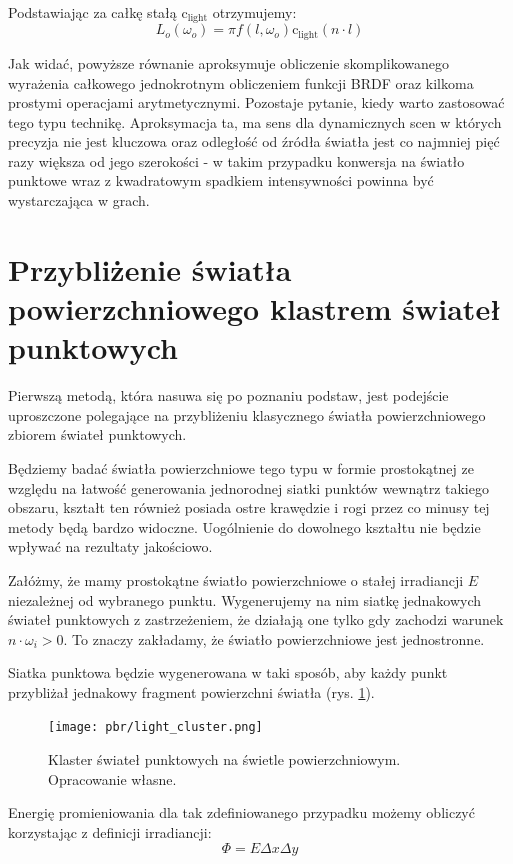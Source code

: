 \documentclass[../main.tex]{subfiles}
\newcommand{\clightcolor}{\text{c}_{\text{light}}}
\begin{document}
Podstawiając za całkę stałą $\clightcolor$ otrzymujemy:
\[
	L_o(\omega_o) = \pi f(l, \omega_o) \clightcolor (n \cdot l)
\]

Jak widać, powyższe równanie aproksymuje obliczenie skomplikowanego wyrażenia całkowego jednokrotnym obliczeniem funkcji BRDF oraz kilkoma prostymi operacjami arytmetycznymi. Pozostaje pytanie, kiedy warto zastosować tego typu technikę. Aproksymacja ta, ma sens dla dynamicznych scen w których precyzja nie jest kluczowa oraz odległość od źródła światła jest co najmniej pięć razy większa od jego szerokości \cite{RealTimeRendering2008,lambert_photometria} - w takim przypadku konwersja na światło punktowe wraz z kwadratowym spadkiem intensywności powinna być wystarczająca w grach.


\section{Przybliżenie światła powierzchniowego klastrem świateł punktowych}

Pierwszą metodą, która nasuwa się po poznaniu podstaw, jest podejście uproszczone polegające na przybliżeniu klasycznego światła powierzchniowego zbiorem świateł punktowych.

Będziemy badać światła powierzchniowe tego typu w formie prostokątnej ze względu na łatwość generowania jednorodnej siatki punktów wewnątrz takiego obszaru, kształt ten również posiada ostre krawędzie i rogi przez co minusy tej metody będą bardzo widoczne. Uogólnienie do dowolnego kształtu nie będzie wpływać na rezultaty jakościowo.

Załóżmy, że mamy prostokątne światło powierzchniowe o stałej irradiancji $E$ niezależnej od wybranego punktu. Wygenerujemy na nim siatkę jednakowych świateł punktowych z zastrzeżeniem, że działają one tylko gdy zachodzi warunek $n \cdot \omega_i > 0 $. To znaczy zakładamy, że światło powierzchniowe jest jednostronne.

Siatka punktowa będzie wygenerowana w taki sposób, aby każdy punkt przybliżał jednakowy fragment powierzchni światła (rys. \ref{fig:PointLightCluster}).

\begin{figure}[ht]
  \centering
  \texttt{[image: pbr/light\_cluster.png]}
  \caption{Klaster świateł punktowych na świetle powierzchniowym. Opracowanie własne.}
  \label{fig:PointLightCluster}
\end{figure}

Energię promieniowania dla tak zdefiniowanego przypadku możemy obliczyć korzystając z definicji irradiancji:
\[
	\Phi = E \Delta{x} \Delta{y}
\]
\end{document}

